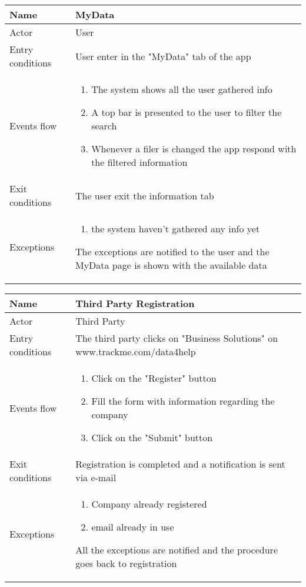 \begin{table}[]
\begin{tabular}{|l|p{12cm}|}
\hline
Name             & MyData \\ \hline
Actor            & User \\ \hline
Entry conditions & User enter in the "MyData" tab of the app \\ \hline
Events flow      & \begin{enumerate}
\item The system shows all the user gathered info
\item A top bar is presented to the user to filter the search
\item Whenever a filer is changed the app respond with the filtered information
\end{enumerate} \\ \hline
Exit conditions  & The user exit the information tab \\ \hline
Exceptions       & \begin{enumerate}
\item the system haven't gathered any info yet
\end{enumerate} The exceptions are notified to the user and the MyData page is shown with the available data \\ \hline
\end{tabular}
\end{table}

\begin{table}[]
\begin{tabular}{|l|p{12cm}|}
\hline
Name             & Third Party Registration \\ \hline
Actor            & Third Party \\ \hline
Entry conditions & The third party clicks on "Business Solutions" on www.trackme.com/data4help \\ \hline
Events flow      & \begin{enumerate}
\item Click on the "Register" button
\item Fill the form with information regarding the company
\item Click on the "Submit" button
\end{enumerate} \\ \hline
Exit conditions  & Registration is completed and a notification is sent via e-mail \\ \hline
Exceptions       & \begin{enumerate}
\item Company already registered
\item email already in use
\end{enumerate} All the exceptions are notified and the procedure goes back to registration \\ \hline
\end{tabular}
\end{table}

